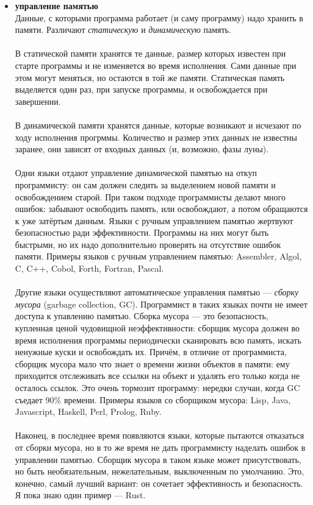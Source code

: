 \documentclass[11pt]{book}
\begin{document}
\begin{itemize}
\item \textbf{управление памятью}
    \\
    Данные, с которыми программа работает (и саму программу) надо хранить в памяти.
    Различают \emph{статическую} и \emph{динамическую} память.
    \\ \\
    В статической памяти хранятся те данные, размер которых известен при старте программы и не изменяется во время исполнения.
    Сами данные при этом могут меняться, но остаются в той же памяти.
    Статическая память выделяется один раз, при запуске программы, и освобождается при завершении.
    \\ \\
    В динамической памяти хранятся данные, которые возникают и исчезают по ходу исполнения прогрммы.
    Количество и размер этих данных не известны заранее, они зависят от входных данных (и, возможно, фазы луны).
    \\ \\
    Одни языки отдают управление динамической памятью на откуп программисту: он сам должен следить за выделением новой памяти и освобождением старой.
    При таком подходе программисты делают много ошибок: забывают освободить память,
    или освобождают, а потом обращаются к уже затёртым данным.
    Языки с ручным управлением памятью жертвуют безопасностью ради эффективности.
    Программы на них могут быть быстрыми, но их надо дополнительно проверять на отсутствие ошибок памяти.
    Примеры языков с ручным управлением памятью: Assembler, Algol, C, C++, Cobol, Forth, Fortran, Pascal.
    \\ \\
    Другие языки осуществляют автоматическое управления памятью --- \emph{сборку мусора} (garbage collection, GC).
    Программист в таких языках почти не имеет доступа к упавлению памятью.
    Сборка мусора --- это безопасность, купленная ценой чудовищной неэффективности:
    сборщик мусора должен во время исполнения программы периодически сканировать всю память, искать ненужные куски и освобождать их.
    Причём, в отличие от программиста, сборщик мусора мало что знает о времени жизни объектов в памяти:
    ему приходится отслеживать все ссылки на объект и удалять его только когда не осталось ссылок.
    Это очень тормозит программу: нередки случаи, когда GC съедает 90\% времени.
    Примеры языков со сборщиком мусора: Lisp, Java, Javascript, Haskell, Perl, Prolog, Ruby.
    \\ \\
    Наконец, в последнее время появляются языки, которые пытаются отказаться от сборки мусора,
    но в то же время не дать программисту наделать ошибок в управлении памятью.
    Сборщик мусора в таком языке может присутствовать, но быть необязательным, нежелательным, выключенным по умолчанию.
    Это, конечно, самый лучший вариант: он сочетает эффективность и безопасность.
    Я пока знаю один пример --- Rust.


\end{itemize}
\end{document}
